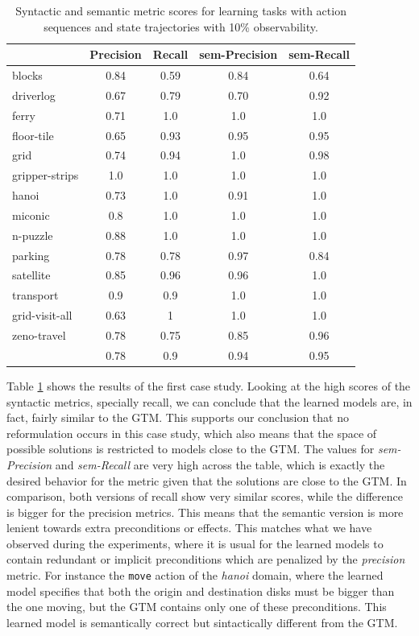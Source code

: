 \begin{table}[hbt!]
     \begin{footnotesize}
	\begin{center}		
		\begin{tabular}{l|c|c|c|c|}		
			& {\bf Precision} & {\bf Recall} & {\bf sem-Precision} & {\bf sem-Recall} \\
			\hline
			blocks & 0.84 & 0.59 & 0.84 & 0.64 \\
			driverlog & 0.67 & 0.79 & 0.70 & 0.92 \\
			ferry & 0.71 & 1.0 & 1.0 & 1.0 \\
			floor-tile & 0.65 & 0.93 & 0.95 & 0.95 \\
			grid & 0.74 & 0.94 & 1.0 & 0.98 \\
			gripper-strips & 1.0 & 1.0 & 1.0 & 1.0 \\
			hanoi & 0.73 & 1.0 & 0.91 & 1.0 \\
			miconic & 0.8 & 1.0	& 1.0 & 1.0 \\
			n-puzzle & 0.88 & 1.0 & 1.0 & 1.0 \\
			parking & 0.78 & 0.78 & 0.97 & 0.84 \\
			satellite & 0.85 & 0.96 & 0.96 & 1.0 \\
			transport & 0.9 & 0.9 & 1.0 & 1.0 \\
			grid-visit-all & 0.63 & 1 & 1.0 & 1.0 \\
			zeno-travel & 0.78 & 0.75 & 0.85 & 0.96 \\
			\hline
			& 0.78 & 0.9 & 0.94 & 0.95
		\end{tabular}
	\end{center}
     \end{footnotesize}
     \caption{\small Syntactic and semantic metric scores for learning tasks with \FO action sequences and \PO state trajectories with 10\% observability.}
     \label{tab:metric_comparison_100_10}
\end{table}

Table \ref{tab:metric_comparison_100_10} shows the results of the first case study. Looking at the high scores of the syntactic metrics, specially recall, we can conclude that the learned models are, in fact, fairly similar to the GTM. This supports our conclusion that no reformulation occurs in this case study, which also means that the space of possible solutions is restricted to models close to the GTM. The values for {\em sem-Precision} and {\em sem-Recall} are very high across the table, which is exactly the desired behavior for the metric given that the solutions are close to the GTM. In comparison, both versions of recall show very similar scores, while the difference is bigger for the precision metrics. This means that the semantic version is more lenient towards extra preconditions or effects. This matches what we have observed during the experiments, where it is usual for the learned models to contain redundant or implicit preconditions which are penalized by the {\em precision} metric. For instance the {\tt move} action of the {\em hanoi} domain, where the learned model specifies that both the origin and destination disks must be bigger than the one moving, but the GTM contains only one of these preconditions. This learned model is semantically correct but sintactically different from the GTM. 

